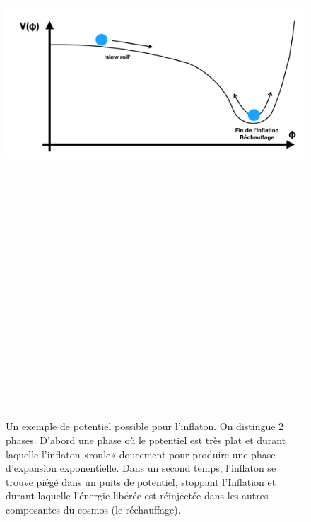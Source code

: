 \begin{figure}[htbp]
	\centering
		\includegraphics[height=25cm]{figs/slowroll.png}
	\caption[Un exemple de potentiel possible pour l'inflaton. ]{Un exemple de potentiel possible pour l'inflaton. On distingue 2 phases. D'abord une phase où le potentiel est très plat et durant laquelle l'inflaton «roule» doucement pour produire une phase d'expansion exponentielle. Dans un second temps, l'inflaton se trouve piégé dans un puits de potentiel, stoppant l'Inflation et durant laquelle l'énergie libérée est réinjectée dans les autres composantes du cosmos (le réchauffage).}
	\label{f:slowroll}
\end{figure}


